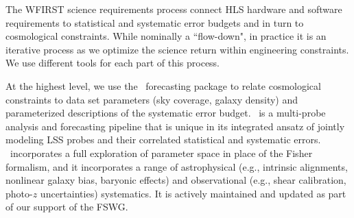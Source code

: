 %
%

\begin{summary}
The WFIRST science requirements process connect HLS
hardware and software requirements to statistical and systematic error budgets
and in turn to  cosmological constraints. While nominally a ``flow-down",  in
practice it is an iterative process as we optimize the science return within
engineering  constraints. We use different tools for each part of this process.
\end{summary}

At the highest level, we  use the \CoLi\ forecasting package to relate cosmological
constraints to data set parameters (sky coverage, galaxy density) and
parameterized descriptions of the systematic error budget. \CoLi\ is a
multi-probe analysis and forecasting pipeline that is unique in its integrated
ansatz of jointly modeling LSS probes and their correlated statistical and
systematic errors. \CoLi\ incorporates a full exploration of parameter space in
place of the Fisher formalism, and it incorporates a range of astrophysical
(e.g., intrinsic alignments, nonlinear galaxy bias, baryonic effects) and
observational (e.g., shear calibration, photo-$z$ uncertainties) systematics. It
is actively maintained and updated as part of our support of the FSWG.




